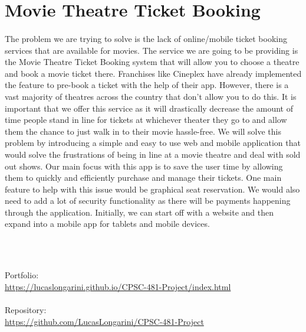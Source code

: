 \documentclass{article}
\begin{document}
\section{Movie Theatre Ticket Booking}
\paragraph{}
The problem we are trying to solve is the lack of online/mobile ticket booking services that are available for movies.
The service we are going to be providing is the Movie Theatre Ticket Booking system that will allow you to choose a theatre and book a movie ticket there.
Franchises like Cineplex have already implemented the feature to pre-book a ticket with the help of their app. However, there is a vast majority of theatres across the country that don’t allow you to do this.
It is important that we offer this service as it will drastically decrease the amount of time people stand in line for tickets at whichever theater they go to and allow them the chance to just walk in to their movie hassle-free.
We will solve this problem by introducing a simple and easy to use web and mobile application that would solve the frustrations of being in line at a movie theatre and deal with sold out shows.
Our main focus with this app is to save the user time by allowing them to quickly and efficiently purchase and manage their tickets. One main feature to help with this issue would be graphical seat reservation.
We would also need to add a lot of security functionality as there will be payments happening through the application. Initially,  we can start off with a website and then expand into a mobile app for tablets and mobile devices.

\\~\\

\begin{flushleft}  
Portfolio:
\\ \url{https://lucaslongarini.github.io/CPSC-481-Project/index.html}
\\~\\
Repository:
\\ \url{https://github.com/LucasLongarini/CPSC-481-Project}
\end{flushleft}  
\end{document}
